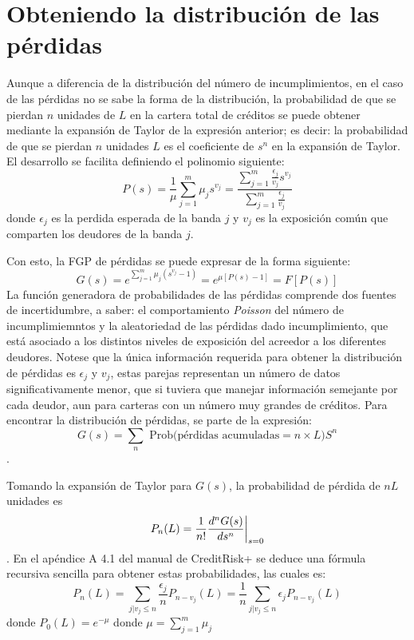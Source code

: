 \documentclass[
  12pt,
]{krantz}
\theoremstyle{definition}
\theoremstyle{definition}
\theoremstyle{definition}
\theoremstyle{remark}
\begin{document}
\hypertarget{obteniendo-la-distribucion-de-las-perdidas}{%
\section{Obteniendo la distribución de las pérdidas}\label{obteniendo-la-distribucion-de-las-perdidas}}

Aunque a diferencia de la distribución del número de incumplimientos, en el caso de las pérdidas no se sabe la forma de la distribución, la probabilidad de que se pierdan \(n\) unidades de \(L\) en la cartera total de créditos se puede obtener mediante la expansión de Taylor de la expresión anterior; es decir: la probabilidad de que se pierdan \(n\) unidades \(L\) es el coeficiente de \(s^n\) en la expansión de Taylor. El desarrollo se facilita definiendo el polinomio siguiente:\[P(s)=\frac{1}{\mu}\sum_{j=1}^m\mu_js^{v_j}=\frac{\sum_{j=1}^m\frac{\epsilon_j}{{v_j}}s^{v_j}}{\sum_{j=1}^m\frac{\epsilon_j}{{v_j}}}\] donde \(\epsilon_j\) es la perdida esperada de la banda \(j\) y \(v_j\) es la exposición común que comparten los deudores de la banda \(j\).

Con esto, la FGP de pérdidas se puede expresar de la forma siguiente:\[G(s)=e^{\sum_{j=1}^m\mu_j(s^{v_j}-1)}=e^{\mu[P(s)-1]}=F[P(s)]\]
La función generadora de probabilidades de las pérdidas comprende dos fuentes de incertidumbre, a saber: el comportamiento \emph{Poisson} del número de incumplimiemntos y la aleatoriedad de las pérdidas dado incumplimiento, que está asociado a los distintos niveles de exposición del acreedor a los diferentes deudores. Notese que la única información requerida para obtener la distribución de pérdidas es \(\epsilon_j\) y \(v_j\), estas parejas representan un número de datos significativamente menor, que si tuviera que manejar información semejante por cada deudor, aun para carteras con un número muy grandes de créditos.
Para encontrar la distribución de pérdidas, se parte de la expresión:\[G(s)=\sum_n\textrm{ Prob(pérdidas acumuladas}=n\times L)S^n \].

Tomando la expansión de Taylor para \(G(s)\), la probabilidad de pérdida de \(nL\) unidades es\[P_n(L)=\frac{1}{n!}\frac{d^nG(s)}{ds^n}\bigg{|}_{s=0}\]. En el apéndice A 4.1 del manual de CreditRisk+ se deduce una fórmula recursiva sencilla para obtener estas probabilidades, las cuales es:\[P_n(L)=\sum_{j|v_j\le n}\frac{\epsilon_j}{n}P_{n-v_j}(L)=\frac{1}{n}\sum_{j|v_j\le n}\epsilon_jP_{n-v_j}(L)\]
donde \(P_0(L)=e^{-\mu}\) donde \(\mu=\sum_{j=1}^m\mu_j\)
\end{document}
